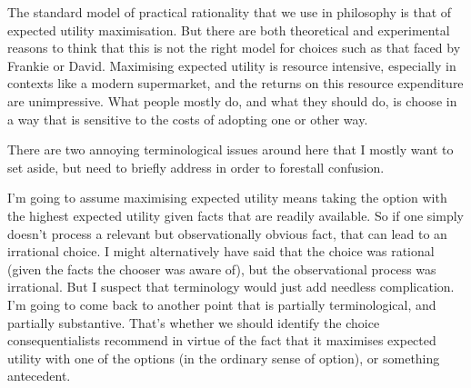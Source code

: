 \documentclass[11pt,]{book}
\begin{document}
The standard model of practical rationality that we use in philosophy is that of expected utility maximisation. But there are both theoretical and experimental reasons to think that this is not the right model for choices such as that faced by Frankie or David. Maximising expected utility is resource intensive, especially in contexts like a modern supermarket, and the returns on this resource expenditure are unimpressive. What people mostly do, and what they should do, is choose in a way that is sensitive to the costs of adopting one or other way.

There are two annoying terminological issues around here that I mostly want to set aside, but need to briefly address in order to forestall confusion.

I'm going to assume maximising expected utility means taking the option with the highest expected utility given facts that are readily available. So if one simply doesn't process a relevant but observationally obvious fact, that can lead to an irrational choice. I might alternatively have said that the choice was rational (given the facts the chooser was aware of), but the observational process was irrational. But I suspect that terminology would just add needless complication. I'm going to come back to another point that is partially terminological, and partially substantive. That's whether we should identify the choice consequentialists recommend in virtue of the fact that it maximises expected utility with one of the options (in the ordinary sense of option), or something antecedent.
\end{document}
